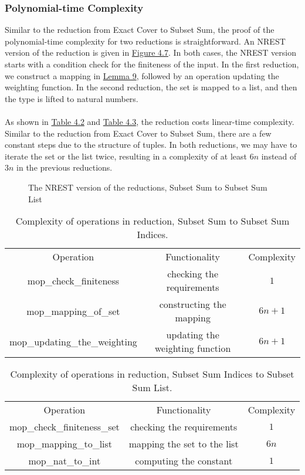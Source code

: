 \subsubsection*{Polynomial-time Complexity}
Similar to the reduction from Exact Cover to Subset Sum, the proof of the polynomial-time complexity for two reductions 
is straightforward. An NREST version of the reduction is given in \hyperref[fig:4.7]{Figure 4.7}.
In both cases, the NREST version starts with a condition check for the finiteness of the input. 
In the first reduction, we construct a mapping in \hyperref[lemma:9]{Lemma 9}, 
followed by an operation updating the weighting function. 
In the second reduction, the set is mapped to a list, and then the type is lifted to natural numbers. \\\\
As shown in \hyperref[table:4.2]{Table 4.2} and \hyperref[table:4.3]{Table 4.3}, the reduction 
costs linear-time complexity. 
Similar to the reduction from Exact Cover to Subset Sum, there are a few constant steps due to the structure of tuples. 
In both reductions, we may have to iterate the set or the list twice, resulting in a complexity of at least $6n$ 
instead of $3n$ in the previous reductions.
\begin{figure}[!h]
\caption{The NREST version of the reductions, Subset Sum to Subset Sum List}
\label{fig:4.7}
\end{figure}
\begin{table}[!h]
    \centering 
    \begin{tabular}{| c | c | c |}
        \hline 
        Operation & Functionality & Complexity \\ 
        \hhline{|=|=|=|}
        mop\_check\_finiteness & checking the requirements & $1$ \\ 
        \hline 
        mop\_mapping\_of\_set & constructing the mapping & $6n + 1$ \\ 
        \hline 
        mop\_updating\_the\_weighting & updating the weighting function & $6n + 1$ \\ 
        \hline 
    \end{tabular}
    \caption{Complexity of operations in reduction, Subset Sum to Subset Sum Indices.}
    \label{table:4.2}
\end{table}
\begin{table}[!h]
    \centering 
    \begin{tabular}{| c | c | c |}
        \hline 
        Operation & Functionality & Complexity \\ 
        \hhline{|=|=|=|}
        mop\_check\_finiteness\_set & checking the requirements & $1$ \\ 
        \hline 
        mop\_mapping\_to\_list & mapping the set to the list & $6n$ \\ 
        \hline 
        mop\_nat\_to\_int & computing the constant & $1$ \\ 
        \hline 
    \end{tabular}
    \caption{Complexity of operations in reduction, Subset Sum Indices to Subset Sum List.}
    \label{table:4.3}
\end{table}

